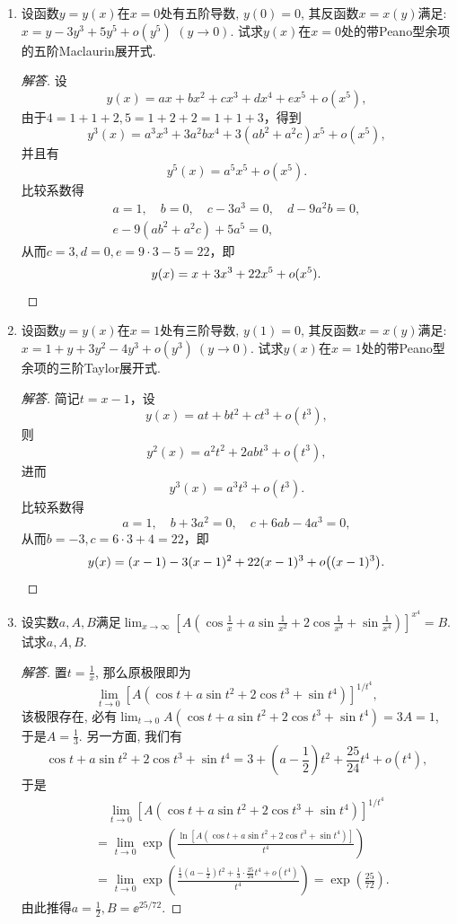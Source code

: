 \begin{6a}
\begin{enumerate}
\begin{proof}[解答]
\end{proof}
\item 设函数\(y=y(x)\)在\(x=0\)处有五阶导数, \(y(0)=0\), 
其反函数\(x=x(y)\)满足: \(x=y-3y^3+5y^5+o(y^5)\) \((y\rightarrow 0)\). 
试求\(y(x)\)在$x=0$处的带Peano型余项的五阶Maclaurin展开式.
\begin{proof}[解答]
设\[y(x)=ax+bx^2+cx^3+dx^4+ex^5+o(x^5),\]
由于$4=1+1+2,5=1+2+2=1+1+3$，得到
\[y^3(x)=a^3x^3+3a^2bx^4+3(ab^2+a^2c)x^5+o(x^5),\]
并且有\[y^5(x)=a^5x^5+o(x^5).\]
比较系数得
\begin{gather*}a=1, \quad b=0, \quad c-3a^3=0, \quad d-9a^2b=0,\\
e-9(ab^2+a^2c)+5a^5=0,\end{gather*}
从而$c=3,d=0,e=9\cdot3-5=22$，即
\[y(x)=x+3x^3+22x^5+o(x^5).\qedhere\]
\end{proof}
\item 设函数\(y=y(x)\)在\(x=1\)处有三阶导数, \(y(1)=0\), 
其反函数\(x=x(y)\)满足:\(x=1+y+3y^2-4y^3+o(y^3)\ (y\rightarrow 0)\). 
试求\(y(x)\)在\(x=1\)处的带Peano型余项的三阶Taylor展开式.
\begin{proof}[解答]
简记$t=x-1$，设
\[y(x)=at+bt^2+ct^3+o(t^3),\]
则\[y^2(x)=a^2t^2+2abt^3+o(t^3),\]
进而\[y^3(x)=a^3t^3+o(t^3).\]
比较系数得
\[a=1, \quad b+3a^2=0, \quad c+6ab-4a^3=0,\]
从而$b=-3,c=6\cdot3+4=22$，即
\[y(x)=(x-1)-3(x-1)^2+22(x-1)^3+o\big((x-1)^3\big).\qedhere\]
\end{proof}
\item 设实数\(a,A,B\)满足\(\lim_{x\rightarrow\infty}\left[A\left(\cos\frac{1}{x}+a\sin\frac{1}{x^2}+2\cos\frac{1}{x^3}+\sin\frac{1}{x^4}\right)\right]^{x^4}=B\). 试求\(a,A,B\).
\begin{proof}[解答]
置\(t=\frac{1}{x}\), 那么原极限即为
\[\lim_{t\rightarrow 0}\left[A\left(\cos t+a\sin t^2+2\cos t^3+\sin t^4\right)\right]^{1/t^4},\]
该极限存在, 必有\(\lim_{t\rightarrow 0}A\left(\cos t+a\sin t^2+2\cos t^3+\sin t^4\right)=3A=1\), 
于是\(A=\frac{1}{3}\). 另一方面, 我们有
\[\cos t+a\sin t^2+2\cos t^3+\sin t^4=3+\left(a-\frac{1}{2}\right)t^2+\frac{25}{24}t^4+o(t^4),\]
于是
\[\begin{aligned}
&\quad\lim_{t\rightarrow 0}\left[A\left(\cos t+a\sin t^2+2\cos t^3+\sin t^4\right)\right]^{1/t^4}\\
&=\lim_{t\rightarrow 0}\exp\left(\frac{\ln \left[A\left(\cos t+a\sin t^2+2\cos t^3+\sin t^4\right)\right]}{t^4}\right)\\
&=\lim_{t\rightarrow 0}\exp\left(\frac{\displaystyle\frac{1}{3}\left(a-\frac{1}{2}\right)t^2+\frac{1}{3}\cdot\frac{25}{24}t^4+o(t^4)}{t^4}\right)
=\exp\left(\frac{25}{72}\right).
\end{aligned}\]
由此推得\(a=\frac{1}{2},B=\ee^{25/72}.\)


\end{proof}
\end{enumerate}
\end{6a}
